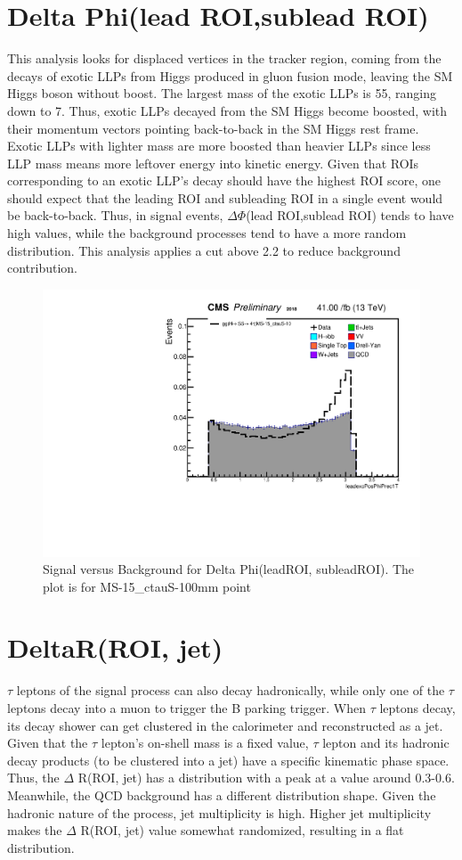 \section{Delta Phi(lead ROI,sublead ROI)}\label{sec:DeltaPhi}
This analysis looks for displaced vertices in the tracker region, coming from the decays of exotic LLPs from Higgs produced in gluon fusion mode, leaving the SM Higgs boson without boost.
The largest mass of the exotic LLPs is 55\GeV, ranging down to 7\GeV.
Thus, exotic LLPs decayed from the SM Higgs become boosted, with their momentum vectors pointing back-to-back in the SM Higgs rest frame.
Exotic LLPs with lighter mass are more boosted than heavier LLPs since less LLP mass means more leftover energy into kinetic energy.
Given that ROIs corresponding to an exotic LLP's decay should have the highest ROI score, one should expect that the leading ROI and subleading ROI in a single event would be back-to-back.
Thus, in signal events, $\Delta\Phi$(lead ROI,sublead ROI) tends to have high values, while the background processes tend to have a more random distribution.
This analysis applies a cut above 2.2 to reduce background contribution.



 \begin{figure}[h!]
   \caption{Signal versus Background for Delta Phi(leadROI, subleadROI). The plot is for MS-15\_ctauS-100mm point}
   \label{fig:leadexcPosPhi}
   \centering
   \includegraphics[width=0.50\linewidth]{figs/EraASR_MS-15_ctauS-10_leadexcPosPhiPrec1T.pdf}
 \end{figure}


\section{DeltaR(ROI, jet)}\label{ref:jetdR}
$\tau$ leptons of the signal process can also decay hadronically, while only one of the $\tau$ leptons decay into a muon to trigger the B parking trigger.
When $\tau$ leptons decay, its decay shower can get clustered in the calorimeter and reconstructed as a jet.
Given that the $\tau$ lepton's on-shell mass is a fixed value, $\tau$ lepton and its hadronic decay products (to be clustered into a jet) have a specific kinematic phase space.
Thus, the $\Delta$ R(ROI, jet) has a distribution with a peak at a value around 0.3-0.6.
Meanwhile, the QCD background has a different distribution shape.
Given the hadronic nature of the process, jet multiplicity is high.
Higher jet multiplicity makes the $\Delta$ R(ROI, jet) value somewhat randomized, resulting in a flat distribution.


